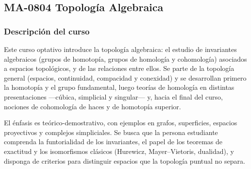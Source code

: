 \newpage
\subsection*{MA-0804 Topología Algebraica}


\hypertarget{MA0804}{}
\begin{refsection}
\begin{table}[H]
\end{table}

\subsubsection*{Descripción del curso}

Este curso optativo introduce la topología algebraica: el estudio de invariantes algebraicos (grupos de homotopía, grupos de homología y cohomología) asociados a espacios topológicos, y de las relaciones entre ellos. Se parte de la topología general (espacios, continuidad, compacidad y conexidad) y se desarrollan primero la homotopía y el grupo fundamental, luego teorías de homología en distintas presentaciones ---cúbica, simplicial y singular--- y, hacia el final del curso, nociones de cohomología de haces y de homotopía superior.

El énfasis es teórico-demostrativo, con ejemplos en grafos, superficies, espacios proyectivos y complejos simpliciales. Se busca que la persona estudiante comprenda la funtorialidad de los invariantes, el papel de los teoremas de exactitud y los isomorfismos clásicos (Hurewicz, Mayer--Vietoris, dualidad), y disponga de criterios para distinguir espacios que la topología puntual no separa.


\end{refsection}
